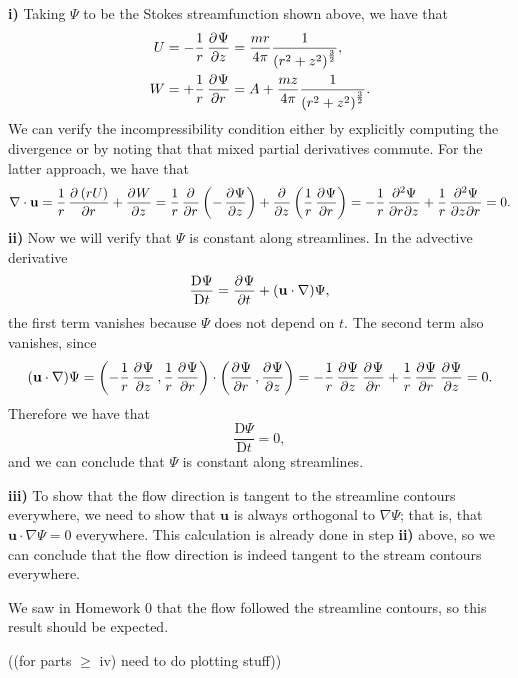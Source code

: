 \documentclass{article}
\def\*#1{\mathbf{#1}}
\newcommand{\dadvd}[2]{\dfrac{\text{D} #1}{\text{D} #2}} %
\begin{document}
\textbf{i)} Taking $\Psi$ to be the Stokes streamfunction shown above,
we have that
%
\begin{align*}
    U &= - \frac{1}{r} \dpd{\Psi}{z}
        = \frac{m r}{4 \pi} \frac{1}{\del{r^2 + z^2}^{\frac{3}{2}}}
        , \\
    W &= + \frac{1}{r} \dpd{\Psi}{r}
        = A + \frac{m z}{4 \pi} \frac{1}{\del{r^2 + z^2}^{\frac{3}{2}}}
        .
\end{align*}
%
We can verify the incompressibility condition either by explicitly
computing the divergence or by noting that that mixed partial
derivatives commute. For the latter approach, we have that
%
\begin{equation*}
    \nabla \cdot \*u
        = \frac{1}{r} \dpd{\del{r U}}{r} + \dpd{W}{z}
        = \frac{1}{r} \dpd{}{r} \del{- \dpd{\Psi}{z}}
            + \dpd{}{z} \del{\frac{1}{r} \dpd{\Psi}{r}}
        = - \frac{1}{r} \dmd{\Psi}{2}{r}{}{z}{}
            + \frac{1}{r} \dmd{\Psi}{2}{z}{}{r}{}
        = 0
        .
\end{equation*}
%
\textbf{ii)} Now we will verify that $\Psi$ is constant along
streamlines. In the advective derivative
%
\begin{equation*}
    \dadvd{\Psi}{t} = \dpd{\Psi}{t} + (\*u \cdot \nabla) \Psi
    ,
\end{equation*}
%
the first term vanishes because $\Psi$ does not depend on $t$. The
second term also vanishes, since
%
\begin{equation*}
    (\*u \cdot \nabla) \Psi
        = \del{- \frac{1}{r} \dpd{\Psi}{z}, \frac{1}{r} \dpd{\Psi}{r}}
            \cdot \del{\dpd{\Psi}{r}, \dpd{\Psi}{z}}
        = - \frac{1}{r} \dpd{\Psi}{z} \dpd{\Psi}{r}
            +\frac{1}{r} \dpd{\Psi}{r} \dpd{\Psi}{z}
        = 0
        .
\end{equation*}
%
Therefore we have that
%
\begin{equation*}
    \dadvd{\Psi}{t} = 0
    ,
\end{equation*}
%
and we can conclude that $\Psi$ is constant along streamlines.

\textbf{iii)} To show that the flow direction is tangent to the
streamline contours everywhere, we need to show that $\*u$ is always
orthogonal to $\nabla \Psi$; that is, that $\*u \cdot \nabla \Psi = 0$
everywhere. This calculation is already done in step \textbf{ii)} above,
so we can conclude that the flow direction is indeed tangent to the
stream contours everywhere.

We saw in Homework 0 that the flow followed the streamline contours, so
this result should be expected.

((for parts $\geq$ iv) need to do plotting stuff))
\end{document}
